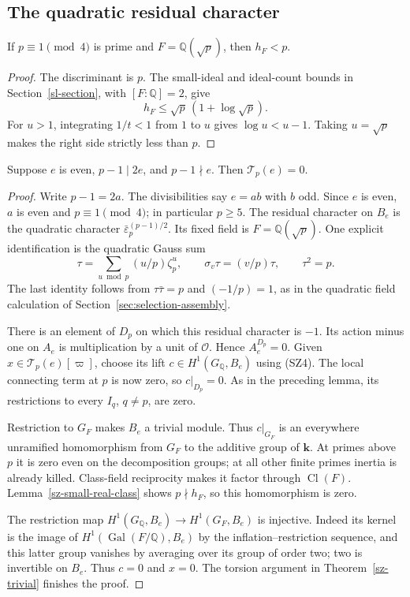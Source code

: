 \subsection{The quadratic residual character}

\begin{lemma}\label{sz-small-real-class}
If $p\equiv1\pmod4$ is prime and $F=\mathbb Q(\sqrt p)$,
then $h_F<p$.
\end{lemma}
\begin{proof}
The discriminant is $p$. The small-ideal and ideal-count
bounds in Section~\ref{sl-section}, with $[F:\mathbb Q]=2$,
give
\[
                         h_F\le\sqrt p\,(1+\log\sqrt p).
\]
For $u>1$, integrating $1/t<1$ from $1$ to $u$ gives
$\log u<u-1$. Taking $u=\sqrt p$ makes the right side
strictly less than $p$.
\end{proof}

\begin{theorem}\label{sz-quadratic}
Suppose $e$ is even, $p-1\mid2e$, and $p-1\nmid e$.
Then $\mathcal T_p(e)=0$.
\end{theorem}
\begin{proof}
Write $p-1=2a$. The divisibilities say $e=ab$ with $b$
odd. Since $e$ is even, $a$ is even and $p\equiv1\pmod4$;
in particular $p\ge5$. The residual character on $B_e$
is the quadratic character
$\bar\varepsilon_p^{(p-1)/2}$. Its fixed field is
$F=\mathbb Q(\sqrt p)$. One explicit identification is the
quadratic Gauss sum
\[
 \tau=\sum_{u\bmod p}(u/p)\zeta_p^u,\qquad
 \sigma_v\tau=(v/p)\tau,\qquad \tau^2=p.
\]
The last identity follows from
$\tau\bar\tau=p$ and $(-1/p)=1$, as in the quadratic
field calculation of Section~\ref{sec:selection-assembly}.

There is an element of $D_p$ on which this residual
character is $-1$. Its action minus one on $A_e$ is
multiplication by a unit of $\mathcal O$. Hence
$A_e^{D_p}=0$. Given $x\in\mathcal T_p(e)[\varpi]$,
choose its lift $c\in H^1(G_{\mathbb Q},B_e)$ using
(SZ4). The local connecting term at $p$ is now zero,
so $c|_{D_p}=0$. As in the preceding lemma, its
restrictions to every $I_q$, $q\ne p$, are zero.

Restriction to $G_F$ makes $B_e$ a trivial module.
Thus $c|_{G_F}$ is an everywhere unramified homomorphism
from $G_F$ to the additive group of $\mathbf k$.
At primes above $p$ it is zero even on the decomposition
groups; at all other finite primes inertia is already
killed. Class-field reciprocity makes it factor through
$\operatorname{Cl}(F)$. Lemma~\ref{sz-small-real-class}
shows $p\nmid h_F$, so this homomorphism is zero.

The restriction map
$H^1(G_{\mathbb Q},B_e)\to H^1(G_F,B_e)$ is injective.
Indeed its kernel is the image of
$H^1(\operatorname{Gal}(F/\mathbb Q),B_e)$ by the
inflation--restriction sequence, and this latter group
vanishes by averaging over its group of order two; two
is invertible on $B_e$. Thus $c=0$ and $x=0$.
The torsion argument in Theorem~\ref{sz-trivial} finishes
the proof.
\end{proof}

